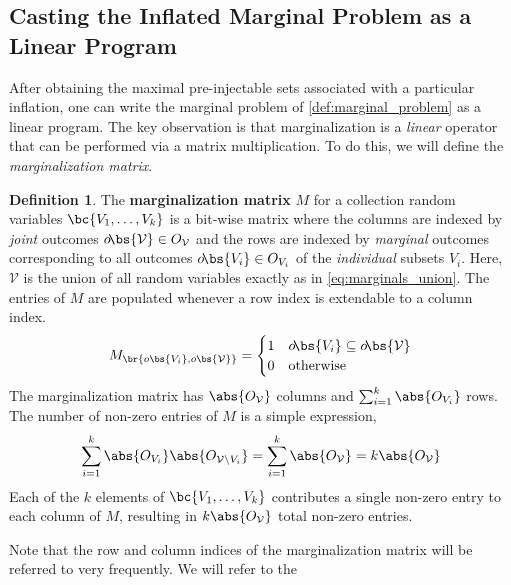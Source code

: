 \documentclass[aps, 10pt, english, twoside, pra, nofootinbib, longbibliography]{revtex4-1}
\theoremstyle{plain}
\theoremstyle{definition}
\newtheorem{definition}[theorem]{Definition}
\theoremstyle{remark}
\newcommand{\term}[1]{\textcolor{Mahogany}{\textbf{#1}}}
\newcommand{\outc}[1]{o\!\bs{#1}}
\begin{document}
    \subsection{Casting the Inflated Marginal Problem as a Linear Program}
    After obtaining the maximal pre-injectable sets associated with a particular inflation, one can write the marginal problem of \cref{def:marginal_problem} as a linear program. The key observation is that marginalization is a \textit{linear} operator that can be performed via a matrix multiplication. To do this, we will define the \textit{marginalization matrix}.
    \begin{definition}
        The \term{marginalization matrix} $M$ for a collection random variables $\bc{V_1, \dots, V_k}$ is a bit-wise matrix where the columns are indexed by \textit{joint} outcomes $\outc{\mathcal{V}} \in O_{\mathcal{V}}$ and the rows are indexed by \textit{marginal} outcomes corresponding to all outcomes $\outc{V_i} \in O_{V_i}$ of the \textit{individual} subsets $V_i$. Here, $\mathcal{V}$ is the union of all random variables exactly as in \cref{eq:marginals_union}. The entries of $M$ are populated whenever a row index is extendable to a column index.
        \[ M_{\br{o\bs{V_i}, o\bs{\mathcal{V}}}} = \begin{cases}
            1 & \outc{V_i} \subseteq \outc{\mathcal{V}} \\
            0 & \text{otherwise}
        \end{cases} \]
        The marginalization matrix has $\abs{O_\mathcal{V}}$ columns and $\sum_{i=1}^{k} \abs{O_{V_i}}$ rows. The number of non-zero entries of $M$ is a simple expression,
        \[ \sum_{i=1}^{k} \abs{O_{V_i}}\abs{O_{\mathcal{V} \setminus V_i}} = \sum_{i=1}^{k} \abs{O_{\mathcal{V}}} = k\abs{O_{\mathcal{V}}} \]
        Each of the $k$ elements of $\bc{V_1, \ldots, V_k}$ contributes a single non-zero entry to each column of $M$, resulting in $k\abs{O_\mathcal{V}}$ total non-zero entries.

        Note that the row and column indices of the marginalization matrix will be referred to very frequently. We will refer to the
    \end{definition}
\end{document}
